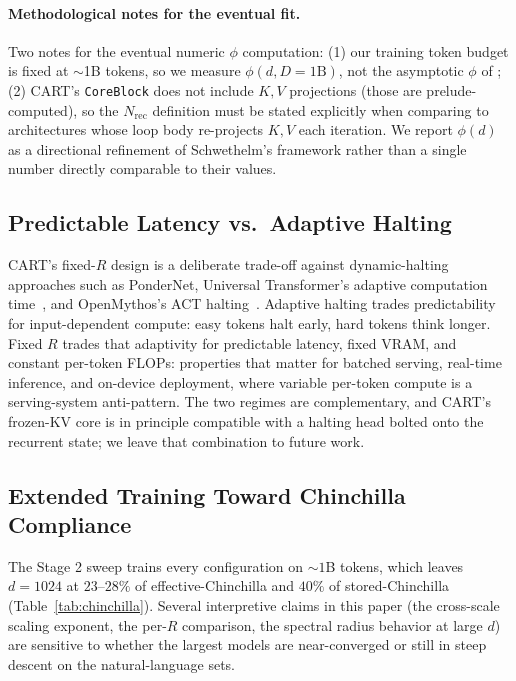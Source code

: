 \documentclass{article}
\newcommand{\cart}{\textsc{CART}}
\begin{document}
\paragraph{Methodological notes for the eventual fit.}
Two notes for the eventual numeric $\phi$ computation: (1) our training token budget is fixed at $\sim$1B tokens, so we measure $\phi(d, D{=}1\text{B})$, not the asymptotic $\phi$ of \citeauthor{schwethelm2026isodepth}; (2) \cart{}'s \texttt{CoreBlock} does not include $K, V$ projections (those are prelude-computed), so the $N_\text{rec}$ definition must be stated explicitly when comparing to architectures whose loop body re-projects $K, V$ each iteration. We report $\phi(d)$ as a directional refinement of Schwethelm's framework rather than a single number directly comparable to their values.

\subsection{Predictable Latency vs.\ Adaptive Halting}

\cart{}'s fixed-$R$ design is a deliberate trade-off against dynamic-halting approaches such as PonderNet, Universal Transformer's adaptive computation time~\citep{dehghani2018universal}, and OpenMythos's ACT halting~\citep{gomez2026openmythos}. Adaptive halting trades predictability for input-dependent compute: easy tokens halt early, hard tokens think longer. Fixed $R$ trades that adaptivity for predictable latency, fixed VRAM, and constant per-token FLOPs: properties that matter for batched serving, real-time inference, and on-device deployment, where variable per-token compute is a serving-system anti-pattern. The two regimes are complementary, and \cart{}'s frozen-KV core is in principle compatible with a halting head bolted onto the recurrent state; we leave that combination to future work.

\subsection{Extended Training Toward Chinchilla Compliance}
\label{sec:extended_training}

The Stage 2 sweep trains every configuration on $\sim 1$B tokens, which leaves $d{=}1024$ at $23$--$28\%$ of effective-Chinchilla and $40\%$ of stored-Chinchilla (Table~\ref{tab:chinchilla}). Several interpretive claims in this paper (the cross-scale scaling exponent, the per-$R$ comparison, the spectral radius behavior at large $d$) are sensitive to whether the largest models are near-converged or still in steep descent on the natural-language sets.
\end{document}
